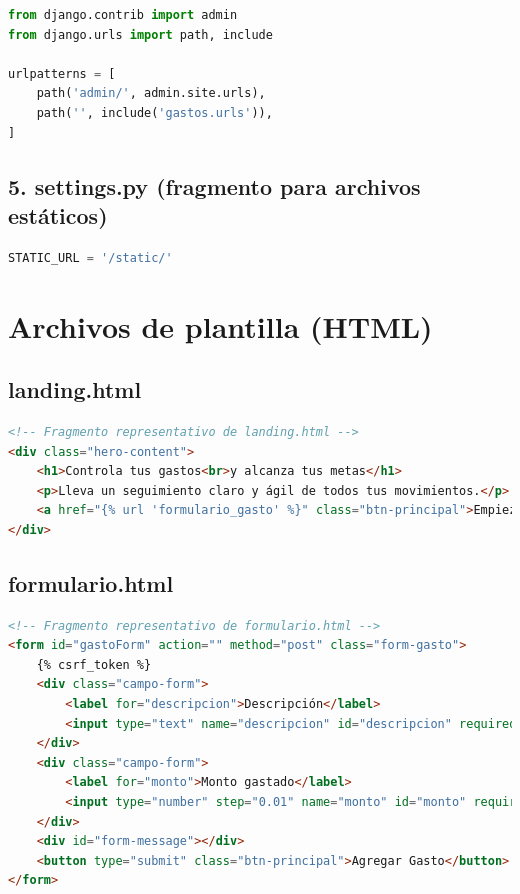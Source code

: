 \documentclass[12pt,a4paper]{article}
\begin{document}
\begin{lstlisting}[language=Python]
from django.contrib import admin
from django.urls import path, include

urlpatterns = [
    path('admin/', admin.site.urls),
    path('', include('gastos.urls')),
]
\end{lstlisting}

\subsection{5. settings.py (fragmento para archivos estáticos)}

\begin{lstlisting}[language=Python]
STATIC_URL = '/static/'
\end{lstlisting}

\section{Archivos de plantilla (HTML)}

\subsection{landing.html}
\begin{lstlisting}[language=HTML]
<!-- Fragmento representativo de landing.html -->
<div class="hero-content">
    <h1>Controla tus gastos<br>y alcanza tus metas</h1>
    <p>Lleva un seguimiento claro y ágil de todos tus movimientos.</p>
    <a href="{% url 'formulario_gasto' %}" class="btn-principal">Empieza ahora</a>
</div>
\end{lstlisting}

\subsection{formulario.html}
\begin{lstlisting}[language=HTML]
<!-- Fragmento representativo de formulario.html -->
<form id="gastoForm" action="" method="post" class="form-gasto">
    {% csrf_token %}
    <div class="campo-form">
        <label for="descripcion">Descripción</label>
        <input type="text" name="descripcion" id="descripcion" required>
    </div>
    <div class="campo-form">
        <label for="monto">Monto gastado</label>
        <input type="number" step="0.01" name="monto" id="monto" required>
    </div>
    <div id="form-message"></div>
    <button type="submit" class="btn-principal">Agregar Gasto</button>
</form>
\end{lstlisting}
\end{document}
